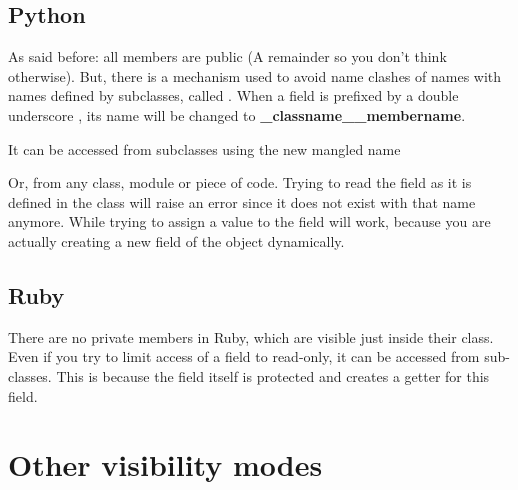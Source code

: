 \documentclass{KodeBook}
\begin{document}
\subsection{Python}

As said before: all members are public (A remainder so you don't think otherwise).
But, there is a mechanism used to avoid name clashes of names with names defined by subclasses, called .
When a field is prefixed by a double underscore \keyword{\_\_}, its name will be changed to \textbf{\_classname\_\_membername}.



It can be accessed from subclasses using the new mangled name



Or, from any class, module or piece of code. 
Trying to read the field as it is defined in the class will raise an error since it does not exist with that name anymore.
While trying to assign a value to the field will work, because you are actually creating a new field of the object dynamically.



\subsection{Ruby}

There are no private members in Ruby, which are visible just inside their class. 
Even if you try to limit access of a field to read-only, it can be accessed from sub-classes. 
This is because the field itself is protected and  creates a getter for this field. 





\section{Other visibility modes}
\end{document}
